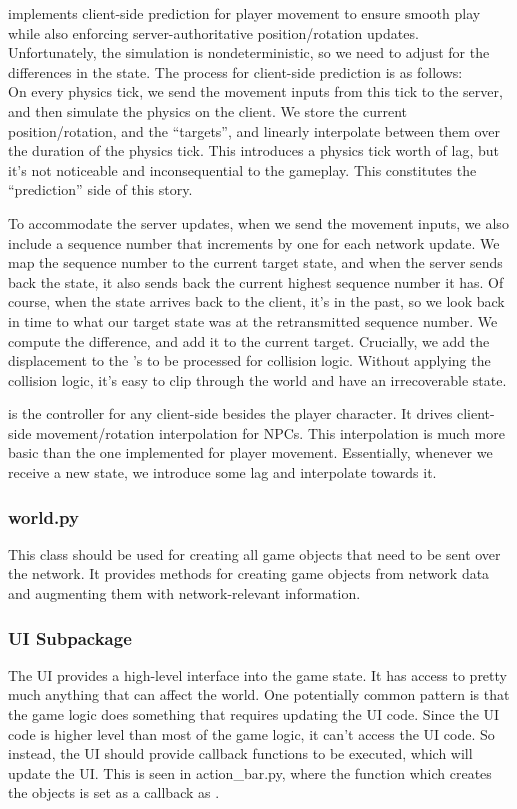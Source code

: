 \documentclass{article}
\begin{document}
 implements client-side prediction for player movement
to ensure smooth play while also enforcing server-authoritative position/rotation updates.
Unfortunately, the simulation is nondeterministic, so we need to adjust for the differences in the state.
The process for client-side prediction is as follows:\\
On every physics tick, we send the movement inputs from this tick to
the server, and then simulate the physics on the client. We store the
current position/rotation, and the ``targets'', and linearly interpolate
between them over the duration of the physics tick. This introduces a
physics tick worth of lag, but it's not noticeable and inconsequential
to the gameplay. This constitutes the ``prediction'' side of this story.

To accommodate the server updates, when we send the movement inputs, we
also include a sequence number that increments by one for each network update.
We map the sequence number to the current target state, and
when the server sends back the state, it also sends back the current
highest sequence number it has. Of course, when the state arrives back
to the client, it's in the past, so we look back in time to what our
target state was at the retransmitted sequence number. We compute the
difference, and add it to the current target. Crucially, we add the
displacement to the 's 
to be processed for collision logic. Without applying the collision logic, it's easy to clip through
the world and have an irrecoverable state.

 is the controller for any client-side  besides the
player character. It drives client-side movement/rotation interpolation for NPCs. This
interpolation is much more basic than the one implemented for player movement. Essentially,
whenever we receive a new state, we introduce some lag and interpolate towards it. 
\subsubsection{world.py}
This class should be used for creating all game objects that need to be sent over the
network. It provides methods for creating game objects from network data and augmenting
them with network-relevant information.
\subsubsection{UI Subpackage}
The UI provides a high-level interface into the game state. It has access to pretty much anything that
can affect the world. One potentially common pattern is that the game logic does something that
requires updating the UI code. Since the UI code is higher level than most of the game logic, it can't
access the UI code. So instead, the UI should provide callback functions to be executed, which will
update the UI. This is seen in action\_bar.py, where the function which creates the 
objects is set as a callback as .
\end{document}
